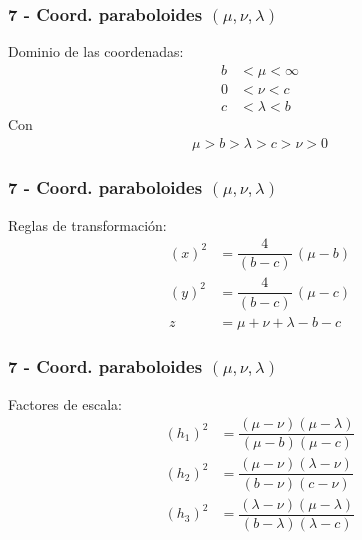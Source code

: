 \documentclass[12pt]{beamer}
\begin{document}
\begin{frame}
\frametitle{7 - Coord. paraboloides $(\mu, \nu, \lambda)$}
\fontsize{12}{12}\selectfont
Dominio de las coordenadas:
\pause
\begin{align*}
b &< \mu < \infty \\
0 &< \nu < c \\
c &< \lambda < b
\end{align*}
Con
\begin{align*}
\mu > b > \lambda > c > \nu > 0
\end{align*}
\end{frame}
\begin{frame}
\frametitle{7 - Coord. paraboloides $(\mu, \nu, \lambda)$}
\fontsize{12}{12}\selectfont
Reglas de transformación:
\pause
\begin{align*}
(x)^{2} &= \dfrac{4}{(b - c)} \, (\mu - b) \\[0.5em]
(y)^{2} &= \dfrac{4}{(b - c)} \, (\mu - c) \\[0.5em]
z &= \mu + \nu + \lambda - b - c
\end{align*}
\end{frame}
\begin{frame}
\frametitle{7 - Coord. paraboloides $(\mu, \nu, \lambda)$}
\fontsize{12}{12}\selectfont
Factores de escala:
\pause
\begin{align*}
(h_{1})^{2} &= \dfrac{(\mu - \nu)(\mu - \lambda)}{(\mu - b)(\mu - c)} \\[0.5em]
(h_{2})^{2} &= \dfrac{(\mu - \nu)(\lambda - \nu)}{(b - \nu)(c - \nu)} \\[0.5em]
(h_{3})^{2} &= \dfrac{(\lambda - \nu)(\mu - \lambda)}{(b - \lambda)(\lambda - c)}
\end{align*}
\end{frame}
\end{document}
